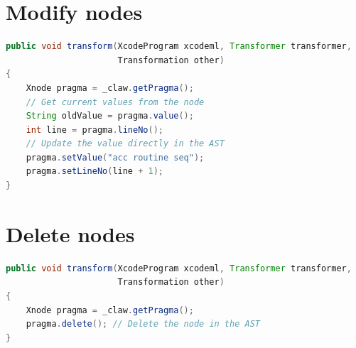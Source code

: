 \documentclass[a4paper, 11pt]{report}
\newcommand{\emptypage}{}
\begin{document}
\section{Modify nodes}

\begin{lstlisting}[label=lst:update_node, language=Java, caption=XcodeML/F update node example]
public void transform(XcodeProgram xcodeml, Transformer transformer,
                      Transformation other)
{                      
    Xnode pragma = _claw.getPragma();
    // Get current values from the node
    String oldValue = pragma.value();
    int line = pragma.lineNo();
    // Update the value directly in the AST
    pragma.setValue("acc routine seq");
    pragma.setLineNo(line + 1);
}
\end{lstlisting}

\section{Delete nodes}
\begin{lstlisting}[label=lst:delete_node, language=Java, caption=XcodeML/F delete node example]
public void transform(XcodeProgram xcodeml, Transformer transformer,
                      Transformation other)
{                      
    Xnode pragma = _claw.getPragma();
    pragma.delete(); // Delete the node in the AST
}
\end{lstlisting}


\pagebreak
\glsaddall
\printglossaries

\emptypage
\pagebreak
\listoffigures

\pagebreak
\listoftables

\emptypage
\pagebreak
\lstlistoflistings

 



%
\end{document}
